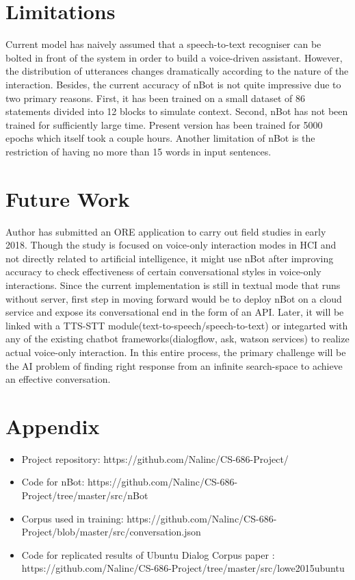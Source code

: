 \documentclass[letterpaper] {article} %
\begin{document}
\section{Limitations}
Current model has naively assumed that a speech-to-text recogniser can be bolted in front of the system in order to build a voice-driven assistant. However, the distribution of utterances changes dramatically according to the nature of the interaction. Besides, the current accuracy of nBot is not quite impressive due to two primary reasons. First, it has been trained on a small dataset of 86 statements divided into 12 blocks to simulate context. Second, nBot has not been trained for sufficiently large time. Present version has been trained for 5000 epochs which itself took a couple hours. Another limitation of nBot is the restriction of having no more than 15 words in input sentences.

\section{Future Work}
Author has submitted an ORE application to carry out field studies in early 2018. Though the study is focused on voice-only interaction modes in HCI and not directly related to artificial intelligence, it might use nBot after improving accuracy to check effectiveness of certain conversational styles in voice-only interactions. Since the current implementation is still in textual mode that runs without server, first step in moving forward would be to deploy nBot on a cloud service and expose its conversational end in the form of an API. Later, it will be linked with a TTS-STT module(text-to-speech/speech-to-text) or integarted with any of the existing chatbot frameworks(dialogflow, ask, watson services) to realize actual voice-only interaction. In this entire process, the primary challenge will be the AI problem of finding right response from an infinite search-space to achieve an effective conversation.



\newpage
\section{Appendix}
\begin{itemize}
	\item Project repository: https://github.com/Nalinc/CS-686-Project/
	\item Code for nBot: https://github.com/Nalinc/CS-686-Project/tree/master/src/nBot
	\item Corpus used in training: https://github.com/Nalinc/CS-686-Project/blob/master/src/conversation.json
	\item Code for replicated results of Ubuntu Dialog Corpus paper \cite{lowe2015ubuntu} : https://github.com/Nalinc/CS-686-Project/tree/master/src/lowe2015ubuntu
\end{itemize}
\end{document}
